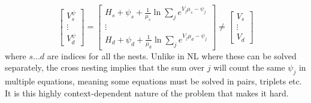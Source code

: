 \begin{equation} \label{eq:utilityshifting}
  \begin{bmatrix}
     V_s^\psi \\
     \vdots \\
     V_d^\psi
  \end{bmatrix} =
\begin{bmatrix}
   H_s + \psi_s + \frac{1}{\mu_s} \ln \sum_j e^{V_j \mu_s - \psi_j} \\
   \vdots \\
  H_d + \psi_d + \frac{1}{\mu_d} \ln \sum_j e^{V_j \mu_d - \psi_j}
  \end{bmatrix} \neq
\begin{bmatrix}
   V_s \\
   \vdots \\
   V_d
\end{bmatrix}
\end{equation}
where $s...d$ are indices for all the nests. Unlike in NL where these can be solved separately, the cross nesting implies that the sum over $j$ will count the same $\psi_j$ in multiple equations, meaning some equations must be solved in pairs, triplets etc. It is this highly context-dependent nature of the problem that makes it hard.
